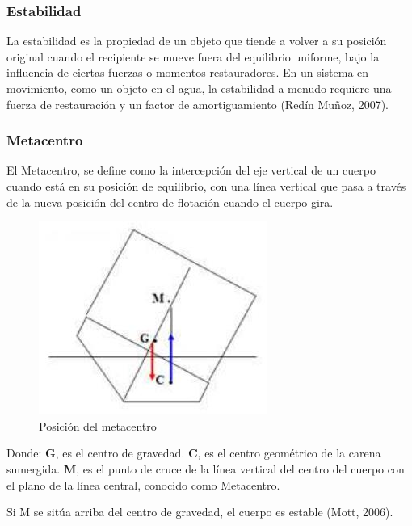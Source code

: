 \documentclass[a4paper,letterpaper]{article}
\begin{document}
\subsubsection*{Estabilidad}
\setlength{\parindent}{18pt}
La estabilidad es la propiedad de un objeto que tiende a volver a su posición original cuando el recipiente 
se mueve fuera del equilibrio uniforme, bajo la influencia de ciertas fuerzas o momentos restauradores. 
En un sistema en movimiento, como un objeto en el agua, la estabilidad a menudo requiere una fuerza de 
restauración y un factor de amortiguamiento (Redín Muñoz, 2007).

\subsubsection*{Metacentro}
\setlength{\parindent}{18pt}
El Metacentro, se define como la intercepción del eje vertical de un cuerpo cuando está en su posición 
de equilibrio, con una línea vertical que pasa a través de la nueva posición del centro de flotación 
cuando el cuerpo gira.
\begin{figure}[h]
	\centering
	\includegraphics[width=0.5 \textwidth]{Metacentrotemporal.jpg}
	\caption{ Posición del metacentro}
	\label{fig:imagen}
\end{figure}
\newline
Donde:
\newline
\textbf{G}, es el centro de gravedad.
\newline
\textbf{C}, es el centro geométrico de la carena sumergida.
\newline
\textbf{M}, es el punto de cruce de la línea vertical del centro del cuerpo con el plano de la línea central, 
conocido como Metacentro.


Si {M} se sitúa arriba del centro de gravedad, el cuerpo es estable (Mott, 2006).
\end{document}
